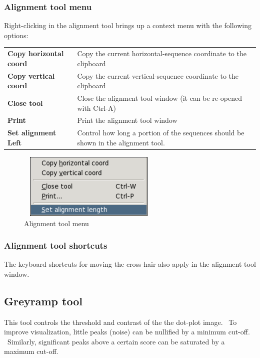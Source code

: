 \documentclass[letterpaper]{article}
\begin{document}
\bigskip

{\color[rgb]{0.30980393,0.5058824,0.7411765}\subsubsection[Alignment tool menu ]{Alignment tool menu }}
{Right-clicking in the alignment tool brings up a context menu with the
following options:}

\begin{center}
\tablehead{}
\begin{supertabular}{p{3.853cm}p{9.653cm}}
\bfseries Copy horizontal coord &
 Copy the current horizontal-sequence coordinate
to the clipboard\\
\bfseries Copy vertical coord &
 Copy the current vertical-sequence coordinate
to the clipboard\\
\bfseries Close tool &
 Close the alignment tool window (it can be
re-opened with Ctrl-A)\\
\bfseries Print &
 Print the alignment tool window\\
\bfseries Set alignment Left &
 Control how long a portion of the sequences
should be shown in the alignment tool.\\
\end{supertabular}
\end{center}

\begin{figure}
 \centering
 \color[rgb]{0.30980393,0.5058824,0.7411765}
 \includegraphics[width=6.853cm,height=3.12cm]{img_menu_alignment_tool.png}
 \caption{Alignment tool menu}
\end{figure}

{\color[rgb]{0.30980393,0.5058824,0.7411765}\subsubsection[Alignment tool shortcuts]{Alignment tool shortcuts}}
{The keyboard shortcuts for moving the cross-hair also apply in the
alignment tool window.}

\bigskip
{\color[rgb]{0.30980393,0.5058824,0.7411765}\subsection[Greyramp tool]{Greyramp tool}}
{This tool controls the threshold and contrast of the the dot-plot image.
\ To improve visualization, little peaks (noise) can be nullified by a
minimum cut-off. \ Similarly, significant peaks above a certain score
can be saturated by a maximum cut-off. }
\end{document}
